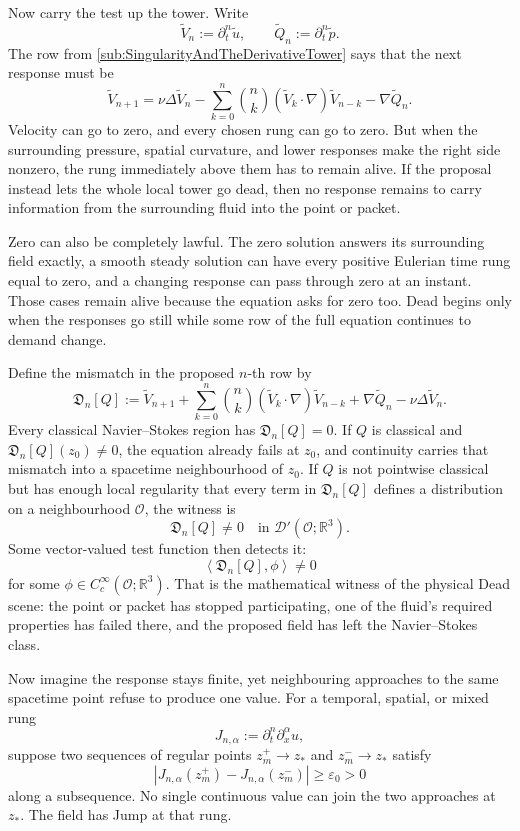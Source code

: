 Now carry the test up the tower.
Write
\[
  \widetilde V_n:=\partial_t^n\widetilde u,
  \qquad
  \widetilde Q_n:=\partial_t^n\widetilde p.
\]
The row from \cref{sub:SingularityAndTheDerivativeTower} says that the next response must be
\[
  \widetilde V_{n+1}
  =
  \nu\Delta\widetilde V_n
  -
  \sum_{k=0}^{n}
  \binom{n}{k}
  (\widetilde V_k\cdot\nabla)\widetilde V_{n-k}
  -
  \nabla\widetilde Q_n.
\]
Velocity can go to zero, and every chosen rung can go to zero.
But when the surrounding pressure, spatial curvature, and lower responses make the right side nonzero, the rung immediately above them has to remain alive.
If the proposal instead lets the whole local tower go dead, then no response remains to carry information from the surrounding fluid into the point or packet.

Zero can also be completely lawful.
The zero solution answers its surrounding field exactly, a smooth steady solution can have every positive Eulerian time rung equal to zero, and a changing response can pass through zero at an instant.
Those cases remain alive because the equation asks for zero too.
Dead begins only when the responses go still while some row of the full equation continues to demand change.

Define the mismatch in the proposed \(n\)-th row by
\[
  \mathfrak D_n[Q]
  :=
  \widetilde V_{n+1}
  +
  \sum_{k=0}^{n}
  \binom{n}{k}
  (\widetilde V_k\cdot\nabla)\widetilde V_{n-k}
  +
  \nabla\widetilde Q_n
  -
  \nu\Delta\widetilde V_n.
\]
Every classical Navier--Stokes region has \(\mathfrak D_n[Q]=0\).
If \(Q\) is classical and \(\mathfrak D_n[Q](z_0)\neq0\), the equation already fails at \(z_0\), and continuity carries that mismatch into a spacetime neighbourhood of \(z_0\).
If \(Q\) is not pointwise classical but has enough local regularity that every term in \(\mathfrak D_n[Q]\) defines a distribution on a neighbourhood \(\mathcal O\), the witness is
\[
  \mathfrak D_n[Q]
  \neq
  0
  \quad
  \text{in }\mathcal D'(\mathcal O;\mathbb R^3).
\]
Some vector-valued test function then detects it:
\[
  \left\langle
    \mathfrak D_n[Q],\phi
  \right\rangle
  \neq0
\]
for some \(\phi\in C_c^\infty(\mathcal O;\mathbb R^3)\).
That is the mathematical witness of the physical Dead scene: the point or packet has stopped participating, one of the fluid's required properties has failed there, and the proposed field has left the Navier--Stokes class.


Now imagine the response stays finite, yet neighbouring approaches to the same spacetime point refuse to produce one value.
For a temporal, spatial, or mixed rung
\[
  J_{n,\alpha}
  :=
  \partial_t^n\partial_x^\alpha u,
\]
suppose two sequences of regular points \(z_m^+\to z_*\) and \(z_m^-\to z_*\) satisfy
\[
  \left|
    J_{n,\alpha}(z_m^+)
    -
    J_{n,\alpha}(z_m^-)
  \right|
  \geq
  \varepsilon_0>0
\]
along a subsequence.
No single continuous value can join the two approaches at \(z_*\).
The field has Jump at that rung.

